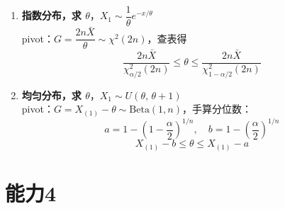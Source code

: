 \begin{enumerate}
    \item \textbf{指数分布，求 $\theta$}，$X_1 \sim \dfrac{1}{\theta}e^{-x/\theta}$ \\
    pivot：$G = \dfrac{2n\bar{X}}{\theta} \sim \chi^2(2n)$，查表得
    $$\frac{2n\bar{X}}{\chi^2_{\alpha/2}(2n)} \leq \theta \leq \frac{2n\bar{X}}{\chi^2_{1-\alpha/2}(2n)}$$

    \item \textbf{均匀分布，求 $\theta$}，$X_1 \sim U(\theta,\,\theta+1)$ \\
    pivot：$G = X_{(1)} - \theta \sim \mathrm{Beta}(1,n)$，手算分位数：
    $$a = 1-\left(1-\frac{\alpha}{2}\right)^{1/n}, \quad b = 1-\left(\frac{\alpha}{2}\right)^{1/n}$$
    $$X_{(1)}-b \leq \theta \leq X_{(1)}-a$$
\end{enumerate}
\chapter{能力4}
